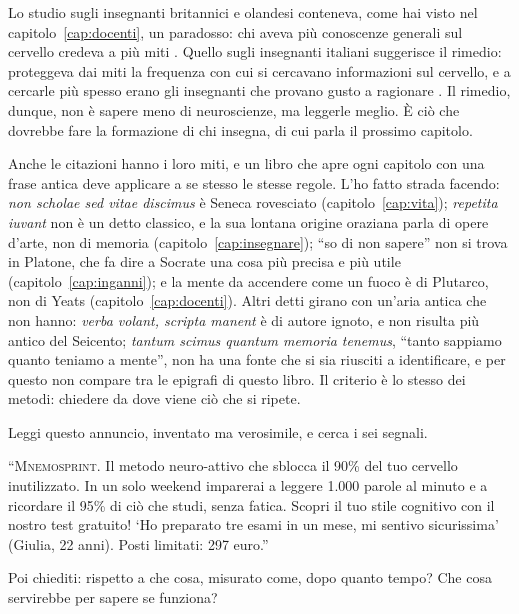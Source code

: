 Lo studio sugli insegnanti britannici e olandesi conteneva, come hai
visto nel capitolo~\ref{cap:docenti}, un paradosso: chi aveva più
conoscenze generali sul cervello credeva a più miti
\parencite{dekker2012}. Quello sugli insegnanti italiani suggerisce
il rimedio: proteggeva dai miti la frequenza con cui si cercavano
informazioni sul cervello, e a cercarle più spesso erano gli insegnanti
che provano gusto a ragionare \parencite{bei2023}. Il rimedio, dunque, non
è sapere meno di neuroscienze, ma leggerle meglio. È ciò che dovrebbe
fare la formazione di chi insegna, di cui parla il prossimo capitolo.

Anche le citazioni hanno i loro miti, e un libro che apre ogni
capitolo con una frase antica deve applicare a se stesso le stesse
regole. L'ho fatto strada facendo: \emph{non scholae sed vitae
discimus} è Seneca rovesciato (capitolo~\ref{cap:vita}); \emph{repetita
iuvant} non è un detto classico, e la sua lontana origine oraziana
parla di opere d'arte, non di memoria (capitolo~\ref{cap:insegnare});
\enquote{so di non sapere} non si trova in Platone, che fa dire a
Socrate una cosa più precisa e più utile (capitolo~\ref{cap:inganni});
e la mente da accendere come un fuoco è di Plutarco, non di Yeats
(capitolo~\ref{cap:docenti}). Altri detti girano con un'aria antica che
non hanno: \emph{verba volant, scripta manent} è di autore ignoto, e
non risulta più antico del Seicento; \emph{tantum scimus quantum
memoria tenemus}, \enquote{tanto sappiamo quanto teniamo a mente}, non
ha una fonte che si sia riusciti a identificare, e per questo non
compare tra le epigrafi di questo libro. Il criterio è lo stesso dei
metodi: chiedere da dove viene ciò che si ripete.

\begin{esercizio}
Leggi questo annuncio, inventato ma verosimile, e cerca i sei
segnali.

\enquote{\textsc{Mnemosprint}. Il metodo neuro-attivo che sblocca
il 90\% del tuo cervello inutilizzato. In un solo weekend imparerai a
leggere 1.000 parole al minuto e a ricordare il 95\% di ciò che
studi, senza fatica. Scopri il tuo stile cognitivo con il nostro test
gratuito! \enquote{Ho preparato tre esami in un mese, mi sentivo
sicurissima} (Giulia, 22 anni). Posti limitati: 297 euro.}

Poi chiediti: rispetto a che cosa, misurato come, dopo quanto tempo?
Che cosa servirebbe per sapere se funziona?
\end{esercizio}

\asterismo

